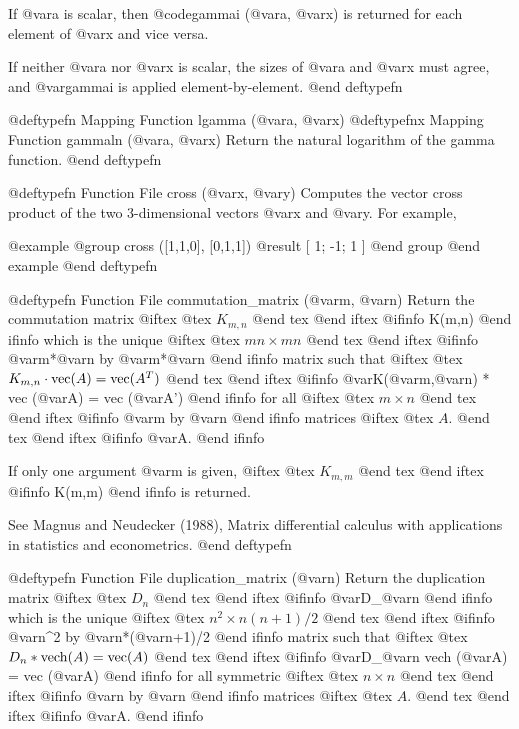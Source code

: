 If @var{a} is scalar, then @code{gammai (@var{a}, @var{x})} is returned
for each element of @var{x} and vice versa.

If neither @var{a} nor @var{x} is scalar, the sizes of @var{a} and
@var{x} must agree, and @var{gammai} is applied element-by-element.
@end deftypefn

@deftypefn {Mapping Function} {} lgamma (@var{a}, @var{x})
@deftypefnx {Mapping Function} {} gammaln (@var{a}, @var{x})
Return the natural logarithm of the gamma function.
@end deftypefn

@deftypefn {Function File} {} cross (@var{x}, @var{y})
Computes the vector cross product of the two 3-dimensional vectors
@var{x} and @var{y}.  For example,

@example
@group
cross ([1,1,0], [0,1,1])
     @result{} [ 1; -1; 1 ]
@end group
@end example
@end deftypefn

@deftypefn {Function File} {} commutation_matrix (@var{m}, @var{n})
Return the commutation matrix
@iftex
@tex
 $K_{m,n}$
@end tex
@end iftex
@ifinfo
 K(m,n)
@end ifinfo
 which is the unique
@iftex
@tex
 $m n \times m n$
@end tex
@end iftex
@ifinfo
 @var{m}*@var{n} by @var{m}*@var{n}
@end ifinfo
 matrix such that
@iftex
@tex
 $K_{m,n} \cdot {\rm vec} (A) = {\rm vec} (A^T)$
@end tex
@end iftex
@ifinfo
 @var{K}(@var{m},@var{n}) * vec (@var{A}) = vec (@var{A}')
@end ifinfo
 for all
@iftex
@tex
 $m\times n$
@end tex
@end iftex
@ifinfo
 @var{m} by @var{n}
@end ifinfo
 matrices
@iftex
@tex
 $A$.
@end tex
@end iftex
@ifinfo
 @var{A}.
@end ifinfo

If only one argument @var{m} is given,
@iftex
@tex
 $K_{m,m}$
@end tex
@end iftex
@ifinfo
 K(m,m)
@end ifinfo
 is returned.

See Magnus and Neudecker (1988), Matrix differential calculus with
applications in statistics and econometrics.
@end deftypefn

@deftypefn {Function File} {} duplication_matrix (@var{n})
Return the duplication matrix
@iftex
@tex
 $D_n$
@end tex
@end iftex
@ifinfo
 @var{D}_@var{n}
@end ifinfo
 which is the unique
@iftex
@tex
 $n^2 \times n(n+1)/2$
@end tex
@end iftex
@ifinfo
 @var{n}^2 by @var{n}*(@var{n}+1)/2
@end ifinfo
 matrix such that
@iftex
@tex
 $D_n * {\rm vech} (A) = {\rm vec} (A)$
@end tex
@end iftex
@ifinfo
 @var{D}_@var{n} \cdot vech (@var{A}) = vec (@var{A})
@end ifinfo
 for all symmetric
@iftex
@tex
 $n \times n$
@end tex
@end iftex
@ifinfo
 @var{n} by @var{n}
@end ifinfo
 matrices
@iftex
@tex
 $A$.
@end tex
@end iftex
@ifinfo
 @var{A}.
@end ifinfo

